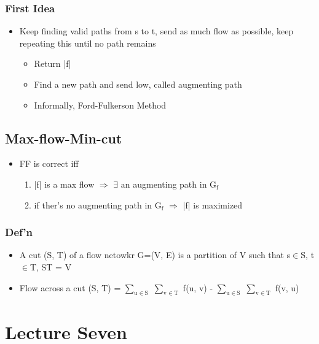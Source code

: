 \documentclass[11pt]{article}
\begin{document}
\subsubsection*{First Idea}
\label{sec:orge5222cd}
\begin{itemize}
\item Keep finding valid paths from s to t, send as much flow as possible, keep repeating this until no path remains
\begin{itemize}
\item Return |f|
\item Find a new path and send low, called augmenting path
\item Informally, Ford-Fulkerson Method
\end{itemize}
\end{itemize}
\subsection*{Max-flow-Min-cut}
\label{sec:org07705ac}
\begin{itemize}
\item FF is correct iff
\begin{enumerate}
\item |f| is a max flow \(\Rightarrow\) \(\exists\) an augmenting path in G\(_{\text{f}}\)
\item if ther's no augmenting path in G\(_{\text{f}}\) \(\Rightarrow\) |f| is maximized
\end{enumerate}
\end{itemize}
\subsubsection*{Def'n}
\label{sec:org421b8a8}
\begin{itemize}
\item A cut (S, T) of a flow netowkr G=(V, E) is a partition of V such that s\(\in\)S, t\(\in\)T, S\union{}T = V
\item Flow across a cut (S, T) = \(\sum_{\text{u }\in\ \text{S}}\) \(\sum_{\text{v }\in\ \text{T}}\) f(u, v) - \(\sum_{\text{u }\in\ \text{S}}\) \(\sum_{\text{v }\in\ \text{T}}\) f(v, u)
\end{itemize}
\section*{Lecture Seven}
\label{sec:org046f8d9}
\end{document}
